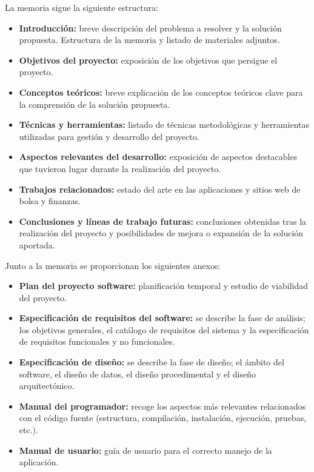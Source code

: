 La memoria sigue la siguiente estructura:

\begin{itemize}
\tightlist
\item
  \textbf{Introducción:} breve descripción del problema a resolver y la
  solución propuesta. Estructura de la memoria y listado de materiales
  adjuntos.
\item
  \textbf{Objetivos del proyecto:} exposición de los objetivos que
  persigue el proyecto.
\item
  \textbf{Conceptos teóricos:} breve explicación de los conceptos
  teóricos clave para la comprensión de la solución propuesta.
\item
  \textbf{Técnicas y herramientas:} listado de técnicas metodológicas y
  herramientas utilizadas para gestión y desarrollo del proyecto.
\item
  \textbf{Aspectos relevantes del desarrollo:} exposición de aspectos
  destacables que tuvieron lugar durante la realización del proyecto.
\item
  \textbf{Trabajos relacionados:} estado del arte en las aplicaciones y sitios web de bolsa y finanzas.
\item
  \textbf{Conclusiones y líneas de trabajo futuras:} conclusiones
  obtenidas tras la realización del proyecto y posibilidades de mejora o
  expansión de la solución aportada.
\end{itemize}

Junto a la memoria se proporcionan los siguientes anexos:

\begin{itemize}
\tightlist
\item
  \textbf{Plan del proyecto software:} planificación temporal y estudio
  de viabilidad del proyecto.
\item
  \textbf{Especificación de requisitos del software:} se describe la
  fase de análisis; los objetivos generales, el catálogo de requisitos
  del sistema y la especificación de requisitos funcionales y no
  funcionales.
\item
  \textbf{Especificación de diseño:} se describe la fase de diseño; el
  ámbito del software, el diseño de datos, el diseño procedimental y el
  diseño arquitectónico.
\item
  \textbf{Manual del programador:} recoge los aspectos más relevantes
  relacionados con el código fuente (estructura, compilación,
  instalación, ejecución, pruebas, etc.).
\item
  \textbf{Manual de usuario:} guía de usuario para el correcto manejo de
  la aplicación.
\end{itemize}

